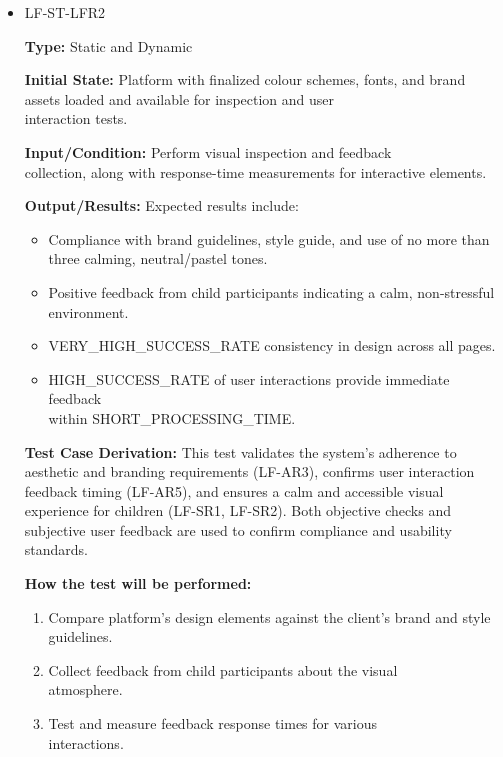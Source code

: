 \documentclass[12pt, titlepage]{article}
\begin{document}
\begin{itemize}
  \item LF-ST-LFR2
  \begin{mdframed}[linewidth=0.5mm] 
    \textbf{Type:} Static and Dynamic \par 
    \textbf{Initial State:} Platform with finalized colour schemes, fonts, and brand assets loaded and available for inspection and user \\interaction tests. \par 
    \textbf{Input/Condition:} Perform visual inspection and feedback \\collection, along with response-time measurements for interactive elements. \par 
    \textbf{Output/Results:} Expected results include: 
    \begin{itemize} 
      \item Compliance with brand guidelines, style guide, and use of no more than three calming, neutral/pastel tones. 
      \item Positive feedback from child participants indicating a calm, non-stressful environment. 
      \item VERY\_HIGH\_SUCCESS\_RATE consistency in design across all pages. 
      \item HIGH\_SUCCESS\_RATE of user interactions provide immediate feedback \\within SHORT\_PROCESSING\_TIME. 
    \end{itemize} \par 
    \textbf{Test Case Derivation:} This test validates the system’s adherence to aesthetic and branding requirements (LF-AR3), confirms user interaction feedback timing (LF-AR5), and ensures a calm and accessible visual experience for children (LF-SR1, LF-SR2). Both objective checks and subjective user feedback are used to confirm compliance and usability standards. \par
    \textbf{How the test will be performed:} 
    \begin{enumerate}[noitemsep] 
      \item Compare platform’s design elements against the client’s brand and style guidelines. 
      \item Collect feedback from child participants about the visual \\atmosphere. 
      \item Test and measure feedback response times for various \\interactions. 
    \end{enumerate} 
  \end{mdframed} 
\end{itemize}
\end{document}
